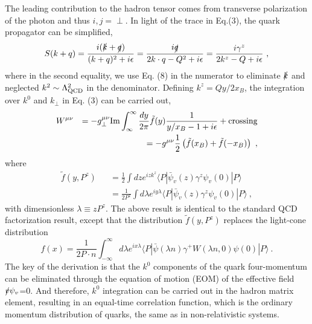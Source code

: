 \documentclass[prd,aps,twocolumn,preprintnumbers,showpacs,nofootinbib,superscriptaddress,notitlepage]{revtex4-1}
\begin{document}
The leading contribution to the hadron tensor comes from transverse polarization of the photon and thus $i, j = \perp$. In light of the trace in Eq.(3), the quark propagator can be simplified,
\begin{equation}
S(k+q) = \frac{i(\slashed{k} +\slashed{q})}{(k+q)^2 + i\epsilon} = \frac{i\slashed{q}}{2k\cdot q -Q^2+i\epsilon} = \frac{i\gamma^z}{2k^z - Q + i\epsilon} \ , 
\end{equation}
where in the second equality, we use Eq. (8) in the numerator to eliminate $\slashed{k}$ and neglected $k^2\sim \Lambda_{\rm QCD}^2$ in the denominator. 
Defining $k^z = Qy/2x_B$,  the integration over $k^0$ and $k_\perp$ in Eq. (3) can be carried out, 
\begin{eqnarray*}
    W^{\mu\nu} && = - g^{\mu\nu}_\perp {\rm Im} \int^\infty_{\infty} \frac{dy}{2\pi}
       \tilde f(y) \frac{1}{y/x_B-1+i\epsilon} + {\rm crossing} \nonumber \\
        &&= - g^{\mu\nu}\frac{1}{2}\left(\tilde f(x_B) + \tilde f(-x_B)\right) \ ,  
\end{eqnarray*}
where 
\begin{eqnarray}
    \tilde f(y, P^z) && = \frac{1}{2} \int dz  e^{izk^z}\langle P|{\bar \psi}_v(z)\gamma^z \psi_v(0)|P\rangle \nonumber \\
      && = \frac{1}{2P^z} \int d\lambda   e^{iy\lambda}\langle P|{\bar \psi}_v(z)\gamma^z \psi_v(0)|P\rangle  \ , 
\end{eqnarray}
with dimensionless $\lambda \equiv zP^z$. The above result is identical to the standard QCD factorization result, except that the 
distribution $\tilde f(y,P^z)$ replaces the light-cone distribution
\begin{equation}
   f(x)  = \frac{1}{2P\cdot n} \int^{\infty}_{-\infty} d\lambda   e^{ix\lambda}\langle P|{\bar \psi}(\lambda n)\gamma^+ W(\lambda n, 0) \psi(0)|P\rangle \ . 
\end{equation} 
The key of the derivation is that the $k^0$ components of the quark four-momentum can be eliminated through the equation of motion (EOM) of the effective field $\slashed{v}\psi_v$=0. And therefore, $k^0$ integration can be carried out 
in the hadron matrix element, resulting in an equal-time correlation function, which
is the ordinary momentum distribution of quarks, the same as in non-relativistic systems.
\end{document}
